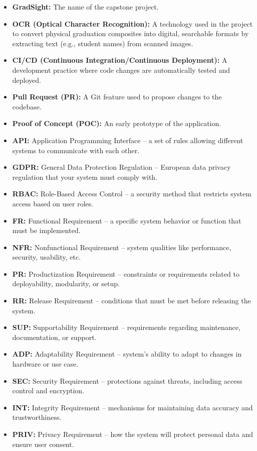 \documentclass[12pt]{article}
\begin{document}
\begin{itemize}
  \item \textbf{GradSight:} The name of the capstone project.
  \item \textbf{OCR (Optical Character Recognition):} A technology used in the project to convert physical graduation composites into digital, searchable formats by extracting text (e.g., student names) from scanned images.
  \item \textbf{CI/CD (Continuous Integration/Continuous Deployment):} A development practice where code changes are automatically tested and deployed.
  \item \textbf{Pull Request (PR):} A Git feature used to propose changes to the codebase.
  \item \textbf{Proof of Concept (POC):} An early prototype of the application.
  \item \textbf{API:} Application Programming Interface – a set of rules allowing different systems to communicate with each other.
  \item \textbf{GDPR:} General Data Protection Regulation – European data privacy regulation that your system must comply with.
  \item \textbf{RBAC:} Role-Based Access Control – a security method that restricts system access based on user roles.
  \item \textbf{FR:} Functional Requirement – a specific system behavior or function that must be implemented.
  \item \textbf{NFR:} Nonfunctional Requirement – system qualities like performance, security, usability, etc.
  \item \textbf{PR:} Productization Requirement – constraints or requirements related to deployability, modularity, or setup.
  \item \textbf{RR:} Release Requirement – conditions that must be met before releasing the system.
  \item \textbf{SUP:} Supportability Requirement – requirements regarding maintenance, documentation, or support.
  \item \textbf{ADP:} Adaptability Requirement – system's ability to adapt to changes in hardware or use case.
  \item \textbf{SEC:} Security Requirement – protections against threats, including access control and encryption.
  \item \textbf{INT:} Integrity Requirement – mechanisms for maintaining data accuracy and trustworthiness.
  \item \textbf{PRIV:} Privacy Requirement – how the system will protect personal data and ensure user consent.

\end{itemize}
\end{document}
